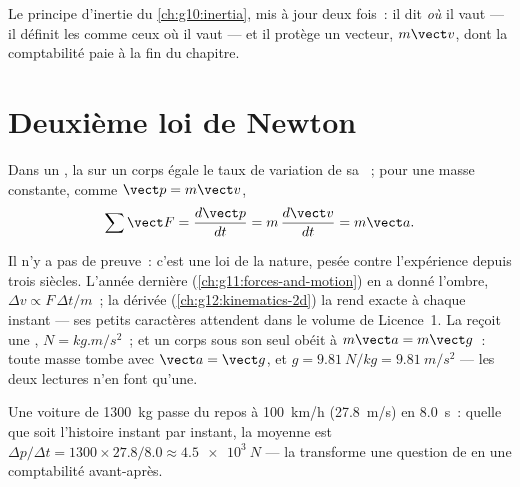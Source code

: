 \begin{remark}\label{rem:g12:newtons-laws:sharpened}
Le principe d'inertie du \cref{ch:g10:inertia}, mis à jour deux fois~: il
dit \emph{où} il vaut --- il définit les  comme
ceux où il vaut --- et il protège un vecteur, $m\vect v$, dont la
comptabilité paie à la fin du chapitre.
\end{remark}

\section{Deuxième loi de Newton}

\begin{theorem}\label{thm:g12:newtons-laws:second}
Dans un , la  sur un
corps égale le taux de variation de sa
~; pour une masse constante, comme
$\vect p = m\vect v$,
\[
\sum \vect F = \frac{d\vect p}{dt} = m\,\frac{d\vect v}{dt} = m \vect a .
\]
\end{theorem}
\admitted

\begin{remark}\label{rem:g12:newtons-laws:nature}
Il n'y a pas de preuve~: c'est une loi de la nature, pesée contre
l'expérience depuis trois siècles. L'année dernière
(\cref{ch:g11:forces-and-motion}) en a donné l'ombre,
$\Delta v \propto F\,\Delta t/m$~; la dérivée
(\cref{ch:g12:kinematics-2d}) la rend exacte à chaque instant --- ses
petits caractères attendent dans le volume de Licence~1. La
 reçoit une ,
$\unit{N} = \unit{kg.m/s^2}$~; et un corps sous son seul
 obéit à $m\vect a = m\vect g$~: toute masse tombe
avec $\vect a = \vect g$, et
$g = \qty{9.81}{N/kg} = \qty{9.81}{m/s^2}$ --- les deux lectures n'en
font qu'une.
\end{remark}

\begin{example}\label{ex:g12:newtons-laws:average}
Une voiture de \qty{1300}{kg} passe du repos à \qty{100}{km/h}
(\qty{27.8}{m/s}) en \qty{8.0}{s}~: quelle que soit l'histoire instant
par instant, la  moyenne est
$\Delta p/\Delta t = 1300 \times 27.8/8.0 \approx \qty{4.5e3}{N}$ ---
la  transforme une question de
 en une comptabilité avant-après.
\end{example}

